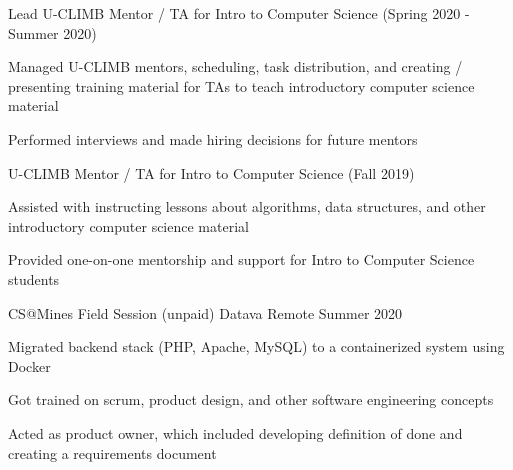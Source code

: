 \begin{cventries}
    \vspace{-1.0mm}
    \cventry
    {Lead U-CLIMB Mentor / TA for Intro to Computer Science (Spring 2020 - Summer 2020)}
    {}
    {}
      {}
    {
    \begin{cvitems}
      \item {Managed U-CLIMB mentors, scheduling, task distribution, and creating / presenting training material for TAs to teach introductory computer science material}
      \item {Performed interviews and made hiring decisions for future mentors}
    \end{cvitems}
    }
    {}
    \cventry
    {U-CLIMB Mentor / TA for Intro to Computer Science (Fall 2019)}
    {}
    {}
    {}
    {
      \ifcv
      \begin{cvitems}
        \item {Assisted with instructing lessons about algorithms, data structures, and other introductory computer science material}
        \item {Provided one-on-one mentorship and support for Intro to Computer Science students}
      \end{cvitems}
      \fi
    }
    {}
    \ifcv
    \vspace{-1.0mm}
    \else
    \vspace{-4.0mm}
    \fi


      \ifcv
    \cventry
    {CS@Mines Field Session (unpaid)}
    {Datava}
    {Remote}
    {Summer 2020}
    {
      \begin{cvitems}
        \item Migrated backend stack (PHP, Apache, MySQL) to a containerized system using Docker
        \item Got trained on scrum, product design, and other software engineering concepts
        \item Acted as product owner, which included developing definition of done and creating a requirements document
      \end{cvitems}
    }
    {}

    


\end{cventries}
